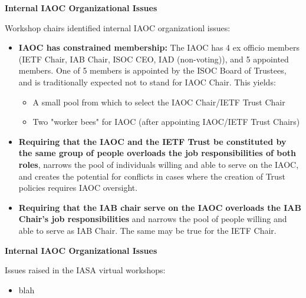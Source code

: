 \documentclass[helvetica]{seminar}
\newcommand{\heading}[1]{%
  \begin{center} 
    \large\bf 
    #1 
  \end{center} 
  \vspace{.4 in}}
\begin{document}
\begin{slide}
\heading{Internal IAOC Organizational Issues}

Workshop chairs identified internal IAOC organizationl issues:
{\footnotesize
\begin{itemize}
\item \textbf{IAOC has constrained membership:} The IAOC has 4 ex
  officio members (IETF Chair, IAB Chair, ISOC CEO, IAD (non-voting)),
  and 5 appointed members.  One of 5 members is appointed by the ISOC
  Board of Trustees, and is traditionally expected not to stand for
  IAOC Chair.  This yields:
  \begin{itemize}
  \item A small pool from which to select the IAOC Chair/IETF Trust
    Chair
  \item Two "worker bees" for IAOC (after appointing IAOC/IETF Trust
    Chairs)
  \end{itemize}
\item \textbf{Requiring that the IAOC and the IETF Trust be
  constituted by the same group of people overloads the job
  responsibilities of both roles}, narrows the pool of individuals
  willing and able to serve on the IAOC, and creates the potential for
  conflicts in cases where the creation of Trust policies requires
  IAOC oversight.
\item \textbf{Requiring that the IAB chair serve on the IAOC overloads
  the IAB Chair's job responsibilities} and narrows the pool of people
  willing and able to serve as IAB Chair.  The same may be true for
  the IETF Chair.
\end{itemize}
}

\end{slide}

\begin{slide}
\heading{Internal IAOC Organizational Issues}

Issues raised in the IASA virtual workshops:
\begin{itemize}
\item blah
\end{itemize}

\end{slide}
\end{document}
